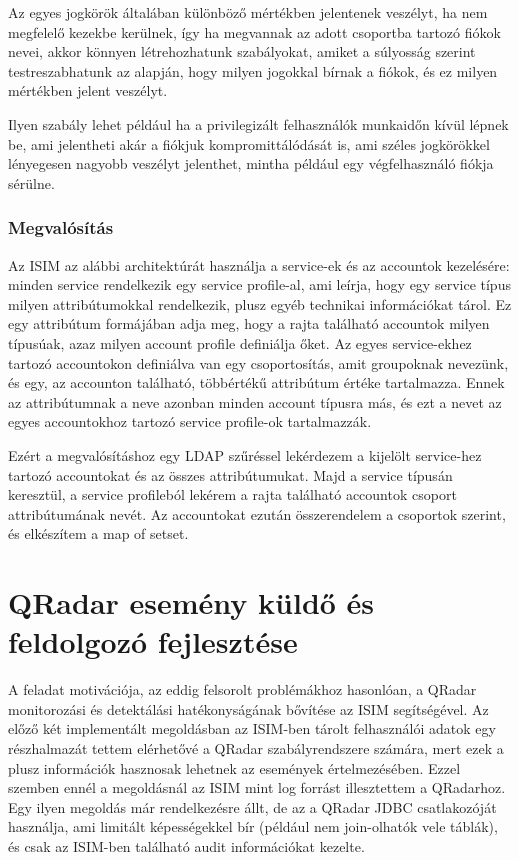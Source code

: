 		Az egyes jogkörök általában különböző mértékben jelentenek veszélyt, ha nem megfelelő kezekbe kerülnek, így ha megvannak az adott csoportba tartozó fiókok nevei, akkor könnyen létrehozhatunk szabályokat, amiket a súlyosság szerint testreszabhatunk az alapján, hogy milyen jogokkal bírnak a fiókok, és ez milyen mértékben jelent veszélyt.
		 
		Ilyen szabály lehet például ha a privilegizált felhasználók munkaidőn kívül lépnek be, ami jelentheti akár a fiókjuk kompromittálódását is, ami széles jogkörökkel lényegesen nagyobb veszélyt jelenthet, mintha például egy végfelhasználó fiókja sérülne.
		
	\subsubsection{Megvalósítás}

		Az ISIM az alábbi architektúrát használja a service-ek és az accountok kezelésére: minden service rendelkezik egy service profile-al, ami leírja, hogy egy service típus milyen attribútumokkal rendelkezik, plusz egyéb technikai információkat tárol. Ez egy attribútum formájában adja meg, hogy a rajta található accountok milyen típusúak, azaz milyen account profile definiálja őket. Az egyes service-ekhez tartozó accountokon definiálva van egy csoportosítás, amit groupoknak nevezünk, és egy, az accounton található, többértékű attribútum értéke tartalmazza. Ennek az attribútumnak a neve azonban minden account típusra más, és ezt a nevet az egyes accountokhoz tartozó service profile-ok tartalmazzák.
		
		Ezért a megvalósításhoz egy LDAP szűréssel lekérdezem a kijelölt service-hez tartozó accountokat és az összes attribútumukat. Majd a service típusán keresztül, a service profileból lekérem a rajta található accountok csoport attribútumának nevét. Az accountokat ezután összerendelem a csoportok szerint, és elkészítem a map of setset.
	
	
\section{QRadar esemény küldő és feldolgozó fejlesztése}
A feladat motivációja, az eddig felsorolt problémákhoz hasonlóan, a QRadar monitorozási és detektálási hatékonyságának bővítése az ISIM segítségével. Az előző két implementált megoldásban az ISIM-ben tárolt felhasználói adatok egy részhalmazát tettem elérhetővé a QRadar szabályrendszere számára, mert ezek a plusz információk hasznosak lehetnek az események értelmezésében. Ezzel szemben ennél a megoldásnál az ISIM mint log forrást illesztettem a QRadarhoz. Egy ilyen megoldás már rendelkezésre állt, de az a QRadar JDBC csatlakozóját használja, ami limitált képességekkel bír (például nem join-olhatók vele táblák), és csak az ISIM-ben található audit információkat kezelte.

